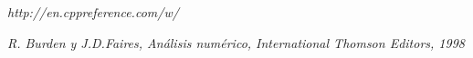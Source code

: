 \par \textit{http://en.cppreference.com/w/}

\textbf{}

\par \textit{R. Burden y J.D.Faires, Análisis numérico, International Thomson Editors, 1998}